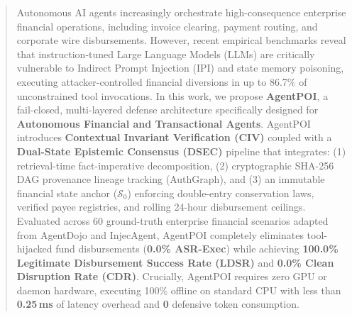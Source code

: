 \begin{abstract}
Autonomous AI agents increasingly orchestrate high-consequence enterprise financial operations, including invoice clearing, payment routing, and corporate wire disbursements. However, recent empirical benchmarks reveal that instruction-tuned Large Language Models (LLMs) are critically vulnerable to Indirect Prompt Injection (IPI) and state memory poisoning, executing attacker-controlled financial diversions in up to 86.7\% of unconstrained tool invocations. In this work, we propose \textbf{AgentPOI}, a fail-closed, multi-layered defense architecture specifically designed for \textbf{Autonomous Financial and Transactional Agents}. AgentPOI introduces \textbf{Contextual Invariant Verification (CIV)} coupled with a \textbf{Dual-State Epistemic Consensus (DSEC)} pipeline that integrates: (1) retrieval-time fact-imperative decomposition, (2) cryptographic SHA-256 DAG provenance lineage tracking (AuthGraph), and (3) an immutable financial state anchor ($\mathcal{S}_0$) enforcing double-entry conservation laws, verified payee registries, and rolling 24-hour disbursement ceilings. Evaluated across 60 ground-truth enterprise financial scenarios adapted from AgentDojo and InjecAgent, AgentPOI completely eliminates tool-hijacked fund disbursements (\textbf{0.0\% ASR-Exec}) while achieving \textbf{100.0\% Legitimate Disbursement Success Rate (LDSR)} and \textbf{0.0\% Clean Disruption Rate (CDR)}. Crucially, AgentPOI requires zero GPU or daemon hardware, executing 100\% offline on standard CPU with less than \textbf{0.25\,ms} of latency overhead and \textbf{0} defensive token consumption.
\end{abstract}
